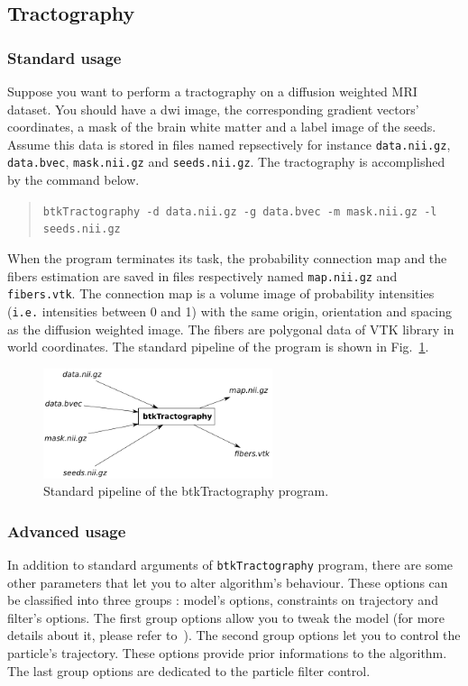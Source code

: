 \subsection{Tractography}

    \subsubsection*{Standard usage}
        Suppose you want to perform a tractography on a diffusion weighted MRI dataset. You should have a dwi image, the corresponding gradient vectors' coordinates, a mask of the brain white matter and a label image of the seeds. Assume this data is stored in files named repsectively for instance \texttt{data.nii.gz}, \texttt{data.bvec}, \texttt{mask.nii.gz} and \texttt{seeds.nii.gz}. The tractography is accomplished by the command below.
            \begin{quote}
                \texttt{btkTractography -d data.nii.gz -g data.bvec -m mask.nii.gz -l seeds.nii.gz}
            \end{quote}
        When the program terminates its task, the probability connection map and the fibers estimation are saved in files respectively named \texttt{map.nii.gz} and \texttt{fibers.vtk}. The connection map is a volume image of probability intensities (\texttt{i.e.} intensities between 0 and 1) with the same origin, orientation and spacing as the diffusion weighted image. The fibers are polygonal data of VTK library in world coordinates. The standard pipeline of the program is shown in Fig.~\ref{btkTractography-fig:standard-pipeline}.
            \begin{figure}
                \centering
                \includegraphics[width=0.6\textwidth]{btkTractographyPipeline}
                \caption{Standard pipeline of the btkTractography program.}
                \label{btkTractography-fig:standard-pipeline}
            \end{figure}

    \subsubsection*{Advanced usage}
        In addition to standard arguments of \texttt{btkTractography} program, there are some other parameters that let you to alter algorithm's behaviour. These options can be classified into three groups : model's options, constraints on trajectory and filter's options. The first group options allow you to tweak the model (for more details about it, please refer to~\cite{descoteaux_regularized_2007}). The second group options let you to control the particle's trajectory. These options provide prior informations to the algorithm. The last group options are dedicated to the particle filter control.

